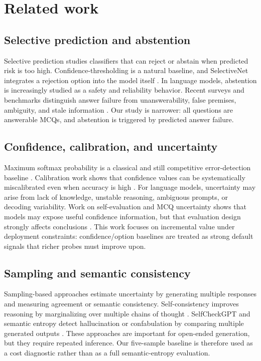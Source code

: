 \documentclass[preprint,12pt,authoryear]{elsarticle}
\begin{document}



\FloatBarrier

\section{Related work}
\subsection{Selective prediction and abstention}
Selective prediction studies classifiers that can reject or abstain when predicted risk is too high. Confidence-thresholding is a natural baseline, and SelectiveNet integrates a rejection option into the model itself \citep{geifman2017selective,geifman2019selectivenet}. In language models, abstention is increasingly studied as a safety and reliability behavior. Recent surveys and benchmarks distinguish answer failure from unanswerability, false premises, ambiguity, and stale information \citep{wen2025limits,kirichenko2025abstentionbench}. Our study is narrower: all questions are answerable MCQs, and abstention is triggered by predicted answer failure.

\subsection{Confidence, calibration, and uncertainty}
Maximum softmax probability is a classical and still competitive error-detection baseline \citep{hendrycks2017baseline}. Calibration work shows that confidence values can be systematically miscalibrated even when accuracy is high \citep{guo2017calibration}. For language models, uncertainty may arise from lack of knowledge, unstable reasoning, ambiguous prompts, or decoding variability. Work on self-evaluation and MCQ uncertainty shows that models may expose useful confidence information, but that evaluation design strongly affects conclusions \citep{kadavath2022lmknow,wang2025ubench}. This work focuses on incremental value under deployment constraints: confidence/option baselines are treated as strong default signals that richer probes must improve upon.

\subsection{Sampling and semantic consistency}
Sampling-based approaches estimate uncertainty by generating multiple responses and measuring agreement or semantic consistency. Self-consistency improves reasoning by marginalizing over multiple chains of thought \citep{wang2023selfconsistency}. SelfCheckGPT and semantic entropy detect hallucination or confabulation by comparing multiple generated outputs \citep{manakul2023selfcheckgpt,farquhar2024semanticentropy}. These approaches are important for open-ended generation, but they require repeated inference. Our five-sample baseline is therefore used as a cost diagnostic rather than as a full semantic-entropy evaluation.
\end{document}
